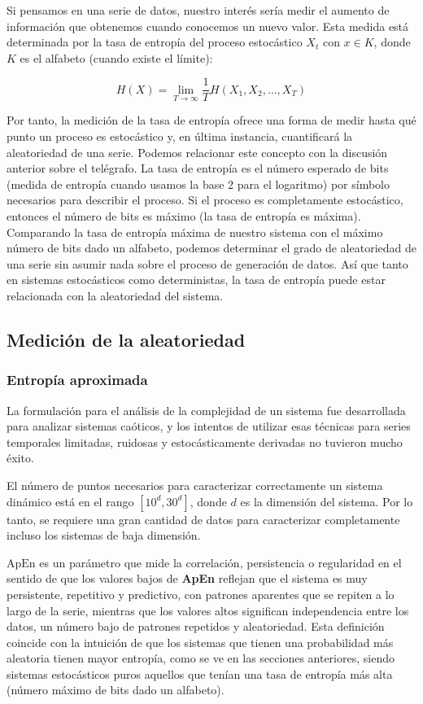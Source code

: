\documentclass[a4paper,12pt]{article}
\begin{document}
Si pensamos en una serie de datos, nuestro interés sería medir el aumento de información que obtenemos cuando conocemos un nuevo valor. Esta medida está determinada por la tasa de entropía del proceso estocástico $X_t$ con $x \in K$, donde $K$ es el alfabeto (cuando existe el límite):

$$H(X) = \lim_{T\to\infty} \frac{1}{T} H(X_1, X_2, \dots, X_T)$$

Por tanto, la medición de la tasa de entropía ofrece una forma de medir hasta qué punto un proceso es estocástico y, en última instancia, cuantificará la aleatoriedad de una serie. Podemos relacionar este concepto con la discusión anterior sobre el telégrafo. La tasa de entropía es el número esperado de bits (medida de entropía cuando usamos la base 2 para el logaritmo) por símbolo necesarios para describir el proceso. Si el proceso es completamente estocástico, entonces el número de bits es máximo (la tasa de entropía es máxima). Comparando la tasa de entropía máxima de nuestro sistema con el máximo número de bits dado un alfabeto, podemos determinar el grado de aleatoriedad de una serie sin asumir nada sobre el proceso de generación de datos. Así que tanto en sistemas estocásticos como deterministas, la tasa de entropía puede estar relacionada con la aleatoriedad del sistema.

\subsection{Medición de la aleatoriedad}
\subsubsection{Entropía aproximada} 

La formulación para el análisis de la complejidad de un sistema fue desarrollada para analizar sistemas caóticos, y los intentos de utilizar esas técnicas para series temporales limitadas, ruidosas y estocásticamente derivadas no tuvieron mucho éxito. 

El número de puntos necesarios para caracterizar correctamente un sistema dinámico está en el rango $[10^d,  30^d]$, donde $d$ es la dimensión del sistema. Por lo tanto, se requiere una gran cantidad de datos para caracterizar completamente incluso los sistemas de baja dimensión. 

\clearpage

$\textrm{ApEn}$ es un parámetro que mide la correlación, persistencia o regularidad en el sentido de que los valores bajos de \textbf{ApEn} reflejan que el sistema es muy persistente, repetitivo y predictivo, con patrones aparentes que se repiten a lo largo de la serie, mientras que los valores altos significan independencia entre los datos, un número bajo de patrones repetidos y aleatoriedad. Esta definición coincide con la intuición de que los sistemas que tienen una probabilidad más aleatoria tienen mayor entropía, como se ve en las secciones anteriores, siendo sistemas estocásticos puros aquellos que tenían una tasa de entropía más alta (número máximo de bits dado un alfabeto).
\end{document}
